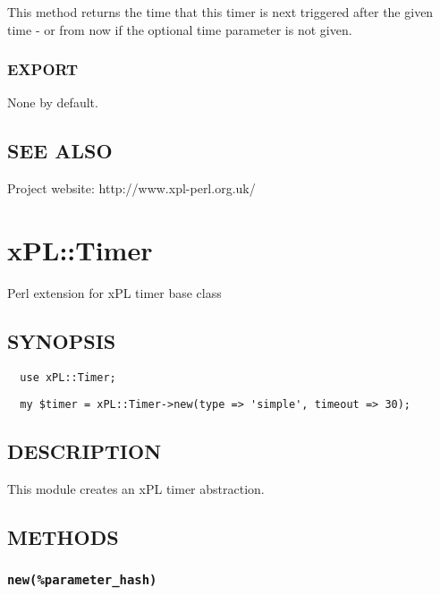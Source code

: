 This method returns the time that this timer is next triggered after
the given time - or from now if the optional time parameter is not
given.

\subsubsection*{EXPORT\label{xPL::Timer::cron_EXPORT}}


None by default.

\subsection*{SEE ALSO\label{xPL::Timer::cron_SEE_ALSO}}


Project website: http://www.xpl-perl.org.uk/

\section{xPL::Timer\label{xPL::Timer}}


Perl extension for xPL timer base class

\subsection*{SYNOPSIS\label{xPL::Timer_SYNOPSIS}}
\begin{verbatim}
  use xPL::Timer;
\end{verbatim}
\begin{verbatim}
  my $timer = xPL::Timer->new(type => 'simple', timeout => 30);
\end{verbatim}
\subsection*{DESCRIPTION\label{xPL::Timer_DESCRIPTION}}


This module creates an xPL timer abstraction.

\subsection*{METHODS\label{xPL::Timer_METHODS}}
\subsubsection*{\texttt{new(\%parameter\_hash)}\label{xPL::Timer_new_parameter_hash_}}


